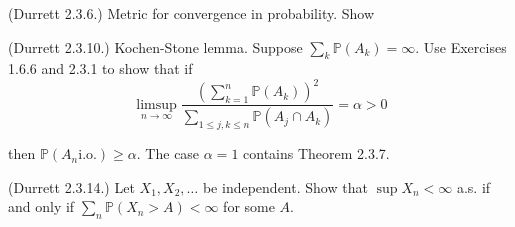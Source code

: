 \documentclass[12pt]{gradescopeexam}
\renewcommand\P{\mathbb{P}}
\newcommand\E{\mathbb{E}}
\begin{document}
\makeheader
\vspace{0.1in}
\begin{questions}
  \begin{question}
    (Durrett 2.3.6.) Metric for convergence in probability. Show
  \end{question}

  \begin{question}
    (Durrett 2.3.10.) Kochen-Stone lemma. Suppose $\sum_k \P (A_k ) = \infty$. Use Exercises
    1.6.6 and 2.3.1 to show that if
    \[ \limsup_{n\to\infty}\frac{\left(\sum_{k=1}^n \P(A_k)\right)^2}%
      {\sum_{1\le j,k\le n} \P(A_j\cap A_k)} = \alpha > 0 \]

    then $\P (A_n \text{i.o.}) \ge \alpha$. The case $\alpha = 1$ contains Theorem 2.3.7.
    \begin{prooforbox}[6in]
    \end{prooforbox}
  \end{question}
  \begin{question}
    (Durrett 2.3.14.) Let $X_1, X_2 , \ldots$ be independent. Show that $\sup X_n < \infty$ a.s. if
    and only if $\sum_n \P (X_n > A) < \infty$ for some $A$.
    \begin{prooforbox}[4in]
    \end{prooforbox}
  \end{question}


\end{questions}
\end{document}
